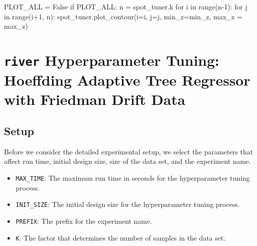 \documentclass[
  letterpaper,
  DIV=11,
  numbers=noendperiod]{scrreprt}
\newenvironment{Shaded}{\begin{snugshade}}{\end{snugshade}}
\newcommand{\BuiltInTok}[1]{\textcolor[rgb]{0.00,0.23,0.31}{#1}}
\newcommand{\ControlFlowTok}[1]{\textcolor[rgb]{0.00,0.23,0.31}{#1}}
\newcommand{\DecValTok}[1]{\textcolor[rgb]{0.68,0.00,0.00}{#1}}
\newcommand{\KeywordTok}[1]{\textcolor[rgb]{0.00,0.23,0.31}{#1}}
\newcommand{\NormalTok}[1]{\textcolor[rgb]{0.00,0.23,0.31}{#1}}
\newcommand{\OperatorTok}[1]{\textcolor[rgb]{0.37,0.37,0.37}{#1}}
\newcommand{\VariableTok}[1]{\textcolor[rgb]{0.07,0.07,0.07}{#1}}
\providecommand{\tightlist}{%
  \setlength{\itemsep}{0pt}\setlength{\parskip}{0pt}}\usepackage{longtable,booktabs,array}
\begin{document}
\begin{Shaded}
\begin{Highlighting}[]
\NormalTok{PLOT\_ALL }\OperatorTok{=} \VariableTok{False}
\ControlFlowTok{if}\NormalTok{ PLOT\_ALL:}
\NormalTok{    n }\OperatorTok{=}\NormalTok{ spot\_tuner.k}
    \ControlFlowTok{for}\NormalTok{ i }\KeywordTok{in} \BuiltInTok{range}\NormalTok{(n}\OperatorTok{{-}}\DecValTok{1}\NormalTok{):}
        \ControlFlowTok{for}\NormalTok{ j }\KeywordTok{in} \BuiltInTok{range}\NormalTok{(i}\OperatorTok{+}\DecValTok{1}\NormalTok{, n):}
\NormalTok{            spot\_tuner.plot\_contour(i}\OperatorTok{=}\NormalTok{i, j}\OperatorTok{=}\NormalTok{j, min\_z}\OperatorTok{=}\NormalTok{min\_z, max\_z }\OperatorTok{=}\NormalTok{ max\_z)}
\end{Highlighting}
\end{Shaded}

\hypertarget{sec-river-hpt}{%
\chapter{\texorpdfstring{\texttt{river} Hyperparameter Tuning: Hoeffding
Adaptive Tree Regressor with Friedman Drift
Data}{river Hyperparameter Tuning: Hoeffding Adaptive Tree Regressor with Friedman Drift Data}}\label{sec-river-hpt}}

\hypertarget{sec-setup-10}{%
\section{Setup}\label{sec-setup-10}}

Before we consider the detailed experimental setup, we select the
parameters that affect run time, initial design size, size of the data
set, and the experiment name.

\begin{itemize}
\tightlist
\item
  \texttt{MAX\_TIME}: The maximum run time in seconds for the
  hyperparameter tuning process.
\item
  \texttt{INIT\_SIZE}: The initial design size for the hyperparameter
  tuning process.
\item
  \texttt{PREFIX}: The prefix for the experiment name.
\item
  \texttt{K}: The factor that determines the number of samples in the
  data set.
\end{itemize}
\end{document}
